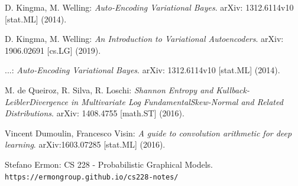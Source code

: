 \documentclass[12pt]{report}
\theoremstyle{definition}
\begin{document}
\begin{thebibliography}{9}

D. Kingma, M. Welling: 
\textit{Auto-Encoding Variational Bayes}. 
arXiv: 1312.6114v10 [stat.ML] (2014).

D. Kingma, M. Welling: 
\textit{An Introduction to Variational Autoencoders}. 
arXiv: 1906.02691 [cs.LG] (2019).

...: 
\textit{Auto-Encoding Variational Bayes}. 
arXiv: 1312.6114v10 [stat.ML] (2014).

M. de Queiroz, R. Silva, R. Loschi: 
\textit{Shannon Entropy and Kullback-LeiblerDivergence in Multivariate Log FundamentalSkew-Normal and Related Distributions}. 
arXiv: 1408.4755 [math.ST] (2016).

Vincent Dumoulin, Francesco Visin: 
\textit{A guide to convolution arithmetic for deep learning}. 
arXiv:1603.07285 [stat.ML] (2016).

Stefano Ermon: CS 228 - Probabilistic Graphical Models.
\\\texttt{https://ermongroup.github.io/cs228-notes/}
\end{thebibliography}
\end{document}
